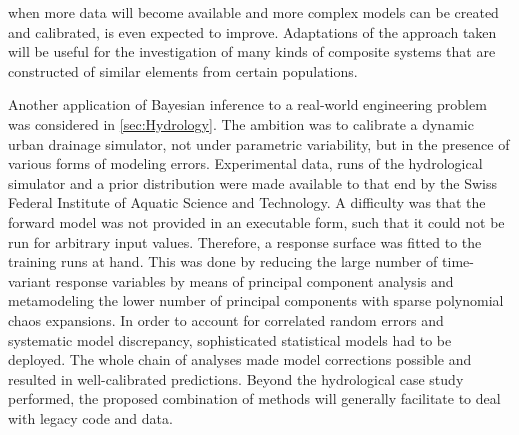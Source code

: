when more data will become available and more complex models can be created and calibrated, is even expected to improve.
Adaptations of the approach taken will be useful for the investigation of many kinds of composite systems that are constructed of similar elements from certain populations.
\par %
Another application of Bayesian inference to a real-world engineering problem was considered in \cref{sec:Hydrology}.
The ambition was to calibrate a dynamic urban drainage simulator, not under parametric variability, but in the presence of various forms of modeling errors.
Experimental data, runs of the hydrological simulator and a prior distribution were made available to that end by the Swiss Federal Institute of Aquatic Science and Technology.
A difficulty was that the forward model was not provided in an executable form, such that it could not be run for arbitrary input values.
Therefore, a response surface was fitted to the training runs at hand.
This was done by reducing the large number of time-variant response variables by means of principal component analysis
and metamodeling the lower number of principal components with sparse polynomial chaos expansions.
In order to account for correlated random errors and systematic model discrepancy, sophisticated statistical models had to be deployed.
The whole chain of analyses made model corrections possible and resulted in well-calibrated predictions.
Beyond the hydrological case study performed, the proposed combination of methods will generally facilitate to deal with legacy code and data.

